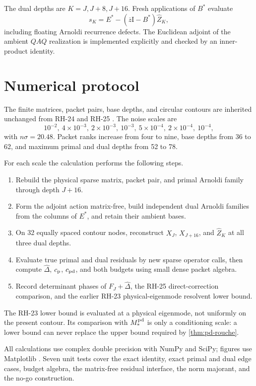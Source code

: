 \documentclass[11pt]{article}
\theoremstyle{definition}
\theoremstyle{remark}
\newcommand{\Id}{\mathrm I}
\begin{document}
The dual depths are \(K=J,J+8,J+16\).  Fresh applications of \(B^*\)
evaluate
\[
 s_K=E^*-(\overline z\Id-B^*)\widehat Z_K,
\]
including floating Arnoldi recurrence defects.  The Euclidean adjoint of
the ambient \(QAQ\) realization is implemented explicitly and checked by
an inner-product identity.

\section{Numerical protocol}
\label{sec:protocol}

The finite matrices, packet pairs, base depths, and circular contours are
inherited unchanged from RH-24 and RH-25
\citep{WangContourFeshbach2026,WangDirectionalRouche2026}.  The noise
scales are
\[
 10^{-2},\ 4\times10^{-3},\ 2\times10^{-3},\ 10^{-3},\
 5\times10^{-4},\ 2\times10^{-4},\ 10^{-4},
\]
with \(n\sigma=20.48\).  Packet ranks increase from four to nine, base
depths from 36 to 62, and maximum primal and dual depths from 52 to 78.

For each scale the calculation performs the following steps.

\begin{enumerate}
 \item Rebuild the physical sparse matrix, packet pair, and primal Arnoldi
 family through depth \(J+16\).
 \item Form the adjoint action matrix-free, build independent dual Arnoldi
 families from the columns of \(E^*\), and retain their ambient bases.
 \item On 32 equally spaced contour nodes, reconstruct \(X_J\),
 \(X_{J+16}\), and \(\widehat Z_K\) at all three dual depths.
 \item Evaluate true primal and dual residuals by new sparse operator calls,
 then compute \(\widehat\Delta\), \(c_{\rm p}\), \(c_{\rm pd}\), and both
 budgets using small dense packet algebra.
 \item Record determinant phases of \(F_J+\widehat\Delta\), the RH-25
 direct-correction comparison, and the earlier RH-23 physical-eigenmode
 resolvent lower bound.
\end{enumerate}

The RH-23 lower bound is evaluated at a physical eigenmode, not uniformly
on the present contour.  Its comparison with \(M_*^{\rm pd}\) is only a
conditioning scale: a lower bound can never replace the upper bound required
by \cref{thm:pd-rouche}.

All calculations use complex double precision with NumPy and SciPy; figures
use Matplotlib \citep{HarrisEtAl2020,VirtanenEtAl2020,Hunter2007}.  Seven
unit tests cover the exact identity, exact primal and dual edge cases,
budget algebra, the matrix-free residual interface, the norm majorant, and
the no-go construction.
\end{document}
